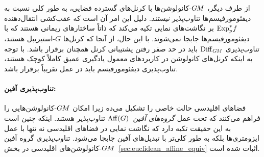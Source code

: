 از طرف دیگر، $G\mkern-1.4muM$-کانولوشن‌ها با کرنل‌های گسترده فضایی، به طور کلی نسبت به دیفئومورفیسم‌ها تناوب‌پذیر \emph{نیستند}.
دلیل این امر آن است که عقب‌کشی انتقال‌دهنده $\operatorname{Exp}^*_p\mkern-2mu f$ بر نگاشت‌های نمایی تکیه می‌کند که ذاتاً ساختارهای ریمانی هستند که با دیفئومورفیسم‌ها جابجا نمی‌شوند.
با این حال، از آنجا که کرنل‌ها $G$-استیریبل هستند، تناوب‌پذیری $\operatorname{Diff}_{G\mkern-1.4muM}$ باید در حد صفر رفتن پشتیبانی کرنل همچنان برقرار باشد.
با توجه به اینکه کرنل‌های کانولوشن در کاربردهای معمول یادگیری عمیق کاملاً کوچک هستند، تناوب‌پذیری دیفئومورفیسم باید در عمل تقریباً برقرار باشد.



\paragraph{تناوب‌پذیری آفین:}
فضاهای اقلیدسی حالت خاصی را تشکیل می‌ده زیرا امکان $G\mkern-1.4muM$-کانولوشن‌هایی را فراهم می‌کنند که تحت عمل \emph{گروه‌های آفین}~$\operatorname{Aff}(G)$ تناوب‌پذیر هستند.
اینکه چنین است به این حقیقت تکیه دارد که نگاشت نمایی در فضاهای اقلیدسی نه تنها با عمل ایزومتری‌ها بلکه به طور کلی‌تر با تبدیل‌های آفین جابجا می‌شود.
تناوب‌پذیری گروه آفین $G\mkern-1.4muM$-کانولوشن‌های اقلیدسی در بخش~\ref{sec:euclidean_affine_equiv} اثبات شده است.